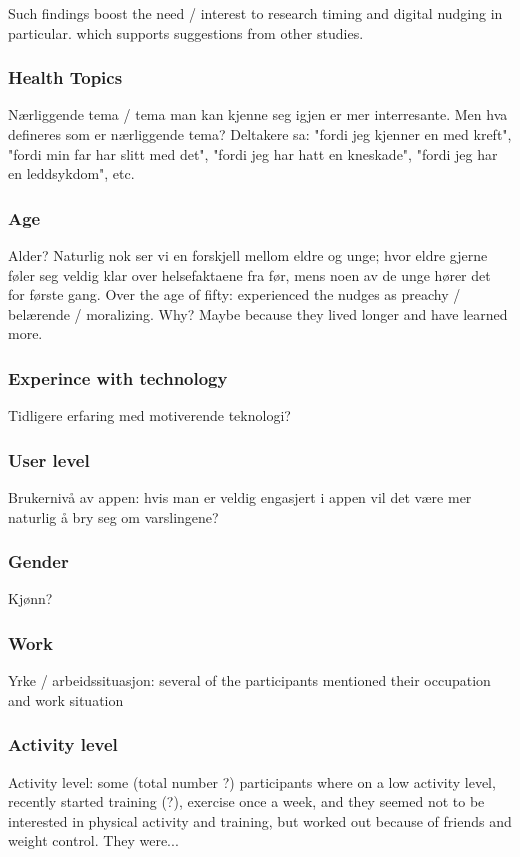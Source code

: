 Such findings boost the need / interest to research timing and digital nudging in particular. which supports suggestions from other studies. 

\subsubsection{Health Topics}
Nærliggende tema / tema man kan kjenne seg igjen er mer interresante. Men hva defineres som er nærliggende tema? Deltakere sa: "fordi jeg kjenner en med kreft", "fordi min far har slitt med det", "fordi jeg har hatt en kneskade", "fordi jeg har en leddsykdom", etc. 

\subsubsection{Age}
Alder? Naturlig nok ser vi en forskjell mellom eldre og unge; hvor eldre gjerne føler seg veldig klar over helsefaktaene fra før, mens noen av de unge hører det for første gang. 
Over the age of fifty: experienced the nudges as preachy / belærende / moralizing. Why? Maybe because they lived longer and have learned more. 

\subsubsection{Experince with technology}
Tidligere erfaring med motiverende teknologi?

\subsubsection{User level}
Brukernivå av appen: hvis man er veldig engasjert i appen vil det være mer naturlig å bry seg om varslingene?

\subsubsection{Gender}
Kjønn?

\subsubsection{Work}
Yrke / arbeidssituasjon: several of the participants mentioned their occupation and work situation

\subsubsection{Activity level}
Activity level: some (total number ?) participants where on a low activity level, recently started training (?), exercise once a week, and they seemed not to be interested in physical activity and training, but worked out because of friends and weight control. They were... 

